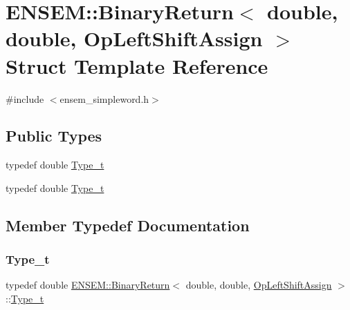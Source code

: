 \hypertarget{structENSEM_1_1BinaryReturn_3_01double_00_01double_00_01OpLeftShiftAssign_01_4}{}\section{E\+N\+S\+EM\+:\+:Binary\+Return$<$ double, double, Op\+Left\+Shift\+Assign $>$ Struct Template Reference}
\label{structENSEM_1_1BinaryReturn_3_01double_00_01double_00_01OpLeftShiftAssign_01_4}


{\ttfamily \#include $<$ensem\+\_\+simpleword.\+h$>$}

\subsection*{Public Types}
\begin{DoxyCompactItemize}
\item 
typedef double \mbox{\hyperlink{structENSEM_1_1BinaryReturn_3_01double_00_01double_00_01OpLeftShiftAssign_01_4_afd8f7fe1e9c353d307a21e9b6f2e7970}{Type\+\_\+t}}
\item 
typedef double \mbox{\hyperlink{structENSEM_1_1BinaryReturn_3_01double_00_01double_00_01OpLeftShiftAssign_01_4_afd8f7fe1e9c353d307a21e9b6f2e7970}{Type\+\_\+t}}
\end{DoxyCompactItemize}


\subsection{Member Typedef Documentation}
\mbox{\label{structENSEM_1_1BinaryReturn_3_01double_00_01double_00_01OpLeftShiftAssign_01_4_afd8f7fe1e9c353d307a21e9b6f2e7970}} 
\subsubsection{\texorpdfstring{Type\_t}{Type\_t}\hspace{0.1cm}{\footnotesize\ttfamily [1/2]}}
{\footnotesize\ttfamily typedef double \mbox{\hyperlink{structENSEM_1_1BinaryReturn}{E\+N\+S\+E\+M\+::\+Binary\+Return}}$<$ double, double, \mbox{\hyperlink{structENSEM_1_1OpLeftShiftAssign}{Op\+Left\+Shift\+Assign}} $>$\+::\mbox{\hyperlink{structENSEM_1_1BinaryReturn_3_01double_00_01double_00_01OpLeftShiftAssign_01_4_afd8f7fe1e9c353d307a21e9b6f2e7970}{Type\+\_\+t}}}

